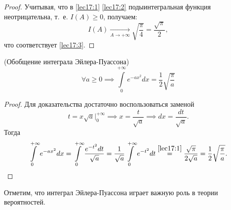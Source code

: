 \documentclass[../../main.tex]{subfiles}
\begin{document}
\begin{proof}
    Учитывая, что в \eqref{lec17:1} \eqref{lec17:2} 
    подыинтегральная функция неотрицательна, т.~е.
    $I(A) \geq 0$, получаем:
    \[
     I(A)\xrightarrow[A\to +\infty]{} 
     \sqrt{\frac{\pi}{4}} = \frac{\sqrt{\pi}}{2},
	\]
	что соответствует \eqref{lec17:3}.
\end{proof}

\begin{crl*}
 (Обобщение интеграла Эйлера-Пуассона)
    \begin{equation}
		 	\label{lec17:9}
		 	\forall a \geq 0 \implies \int\limits_0^{+\infty}e^{-ax^2}dx = 
		 	\frac{1}{2}\sqrt{\frac{\pi}{a}}
    \end{equation}
\end{crl*}
\begin{proof}
 Для доказательства достаточно воспользоваться заменой
 \begin{equation*}
  t = x\sqrt{a}\Big|_0^{+\infty} \implies x = \frac{t}{\sqrt{a}} 
  \implies dx = \frac{dt}{\sqrt{a}}.
 \end{equation*}
  Тогда
\begin{equation*}
    \int\limits_0^{+\infty}e^{-ax^2}dx = 
    \int\limits_{0}^{+\infty}\frac{e^{-t^2}dt}{\sqrt{a}} = 
    \frac{1}{\sqrt{a}} \int\limits_{0}^{+\infty}e^{-t^2}dt 
    \overset{\eqref{lec17:1}}=
    \frac{\sqrt{\pi}}{2\sqrt{a}} =
    \frac{1}{2}\sqrt{\frac{\pi}{a}}.
    \qedhere
\end{equation*}
\end{proof}
Отметим, что интеграл Эйлера-Пуассона играет 
важную роль в теории вероятностей.
\end{document}

